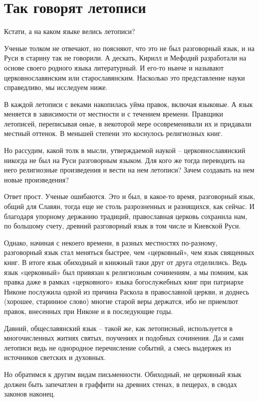 \chapter{Так говорят летописи}

Кстати, а на каком языке велись летописи?

Ученые толком не отвечают, но поясняют, что это не был разговорный язык, и на Руси в старину так не говорили. А дескать, Кирилл и Мефодий разработали на основе своего родного языка литературный. И его-то нынче и называют церковнославянским или старославянским. Насколько это представление науки справедливо, мы исследуем ниже.

В каждой летописи с веками накопилась уйма правок, включая языковые. А язык меняется в зависимости от местности и с течением времени. Правщики летописей, переписывая оные, в некоторой мере осовременивали их и придавали местный оттенок. В меньшей степени это коснулось религиозных книг.

Но рассудим, какой толк в мысли, утверждаемой наукой – церковнославянский никогда не был на Руси разговорным языком. Для кого же тогда переводить на него религиозные произведения и вести на нем летописи? Зачем создавать на нем новые произведения?

Ответ прост. Ученые ошибаются. Это и был, в какое-то время, разговорный язык, общий для Славян, тогда еще не столь разрозненных и разнящихся, как сейчас. И благодаря упорному держанию традиций, православная церковь сохранила нам, по большому счету, древний разговорный язык в том числе и Киевской Руси.

Однако, начиная с некоего времени, в разных местностях по-разному, разговорный язык стал меняться быстрее, чем «церковный», чем язык священных книг. В итоге язык обиходный и книжный таки друг от друга отделились. Ведь язык «церковный» был привязан к религиозным сочинениям, а мы помним, как правка даже в рамках «церковного» языка богослужебных книг при патриархе Никоне послужила одной из причина Раскола в православной церкви, и доднесь (хорошее, старинное слово) многие старой веры держатся, ибо не приемлют правок, внесенных при Никоне и в последующие годы.

Давний, общеславянский язык – такой же, как летописный, используется в многочисленных житиях святых, поучениях и подобных сочинения. Да и сами летописи ведь не однородное перечисление событий, а смесь выдержек из источников светских и духовных.

Но обратимся к другим видам письменности. Обиходный, не церковный язык должен быть запечатлен в граффити на древних стенах, в пещерах, в сводах законов наконец.

